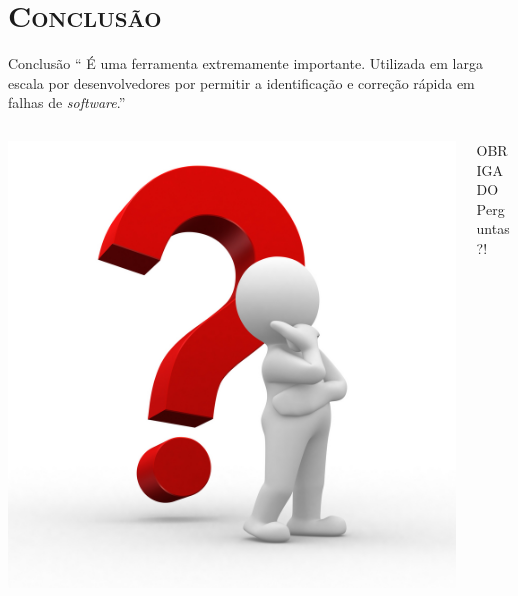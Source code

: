 \section{\scshape Conclusão}
\frame{\tableofcontents[
    currentsection,
    currentsubsection,
    subsectionstyle=show/shaded/hide
]}
\begin{frame}{Conclusão}
    \centering
    `` É uma ferramenta extremamente importante. Utilizada em larga escala por desenvolvedores por permitir a identificação e correção rápida em falhas de \textit{software}.''
\end{frame}

\begin{frame}{}
    \centering
    \begin{columns}
        \begin{column}{0.5\textwidth}
            \begin{center}
                \includegraphics[width=1.2\textwidth]{images/question.jpg}
            \end{center}
        \end{column}
        \begin{column}{0.5\textwidth}
            \centering
            \Large \textsc OBRIGADO\\[0.8em]
            \Large \textsc Perguntas?!
        \end{column}
    \end{columns}
\end{frame}
